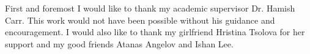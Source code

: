 First and foremost I would like to thank my academic supervisor Dr. Hamish Carr. This work would not have been possible without his guidance and encouragement. I would also like to thank my girlfriend Hristina Tsolova for her support and my good friends Atanas Angelov and Ishan Lee.

%
%
%
